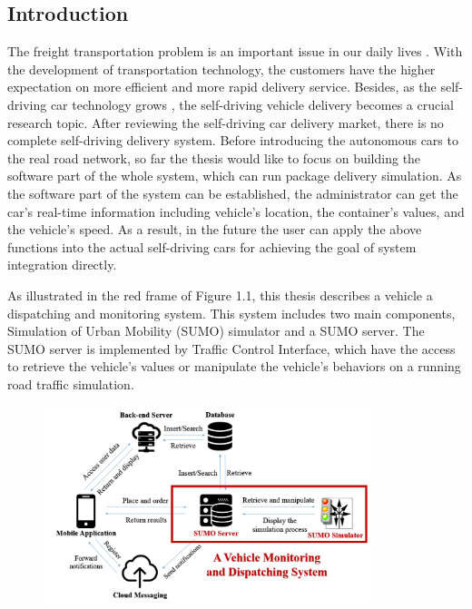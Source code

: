 \documentclass[12pt]{ksthesis}
\begin{document}
\begin{thesis}\large {
\chapter{Introduction} \label{Chap:Introduction}

The freight transportation problem is an important issue in our daily lives \cite{Anand2012} . With the development of transportation technology, the customers have the higher expectation on more efficient and more rapid delivery service. Besides, as the self-driving car technology grows \cite{Lutin2013}, the self-driving vehicle delivery becomes a crucial research topic. After reviewing the self-driving car delivery market, there is no complete self-driving delivery system. 
Before introducing the autonomous cars to the real road network, so far the thesis would like to focus on building the software part of the whole system, which can run package delivery simulation. As the software part of the system can be established, the administrator can get the car’s real-time information including vehicle’s location, the container’s values, and the vehicle’s speed. As a result, in the future the user can apply the above functions into the actual self-driving cars for achieving the goal of system integration directly.

As illustrated in the red frame of Figure 1.1, this thesis describes a vehicle a dispatching and monitoring system. This system includes two main components, Simulation of Urban Mobility (SUMO) simulator and a SUMO server. The SUMO server is implemented by Traffic Control Interface, which have the access to retrieve the vehicle’s values or manipulate the vehicle’s behaviors on a running road traffic simulation.

\begin{figure}[t!]
\centering
\includegraphics[width=0.85\textwidth]{./Thesis_figures/F1-1_System_Design_Overview.PNG}


\end{figure}}
\end{thesis}
\end{document}

